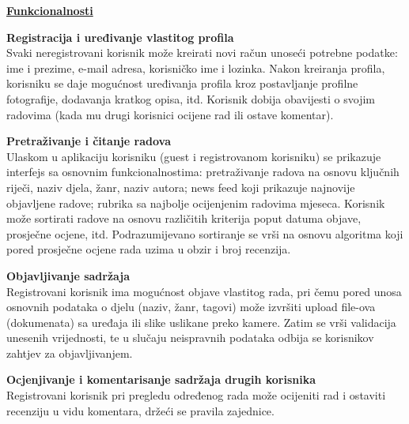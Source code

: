 \documentclass[12pt, a4paper]{report}
\begin{document}
\begin{flushleft}
\textbf{\underline{Funkcionalnosti}} \newline

\textbf{Registracija i uređivanje vlastitog profila} \\
Svaki neregistrovani korisnik može kreirati novi račun unoseći potrebne podatke: ime i prezime, e-mail adresa, korisničko ime i lozinka. Nakon kreiranja profila, korisniku se daje mogućnost uređivanja profila kroz postavljanje profilne fotografije, dodavanja kratkog opisa, itd.
Korisnik dobija obavijesti o svojim radovima (kada mu drugi korisnici ocijene rad ili ostave komentar). \newline

\textbf{Pretraživanje i čitanje radova} \\
Ulaskom u aplikaciju korisniku (guest i registrovanom korisniku) se prikazuje interfejs sa osnovnim funkcionalnostima: pretraživanje radova na osnovu ključnih riječi, naziv djela, žanr, naziv autora; news feed koji prikazuje najnovije objavljene radove; rubrika sa najbolje ocijenjenim radovima mjeseca.
Korisnik može sortirati radove na osnovu različitih kriterija poput datuma objave, prosječne ocjene, itd.
Podrazumijevano sortiranje se vrši na osnovu algoritma koji pored prosječne ocjene rada uzima u obzir i broj recenzija. \newline

\textbf{Objavljivanje sadržaja} \\
Registrovani korisnik ima mogućnost objave vlastitog rada, pri čemu pored unosa osnovnih podataka o djelu (naziv, žanr, tagovi) može izvršiti upload file-ova (dokumenata) sa uređaja ili slike uslikane preko kamere. Zatim se vrši validacija unesenih vrijednosti, te u slučaju neispravnih podataka odbija se korisnikov zahtjev za objavljivanjem. \newline

\textbf{Ocjenjivanje i komentarisanje sadržaja drugih korisnika} \\
Registrovani korisnik pri pregledu određenog rada može ocijeniti rad i ostaviti recenziju u vidu komentara, držeći se pravila zajednice. \newline



\end{flushleft}
\end{document}
